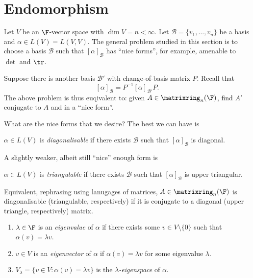 \documentclass[a4paper]{article}
\newcommand*{\M}{\matrixring}
\newcommand*{\basis}{\mathcal}
\theoremstyle{definition}
\begin{document}
\section{Endomorphism}

Let \(V\) be an \(\F\)-vector space with \(\dim V = n < \infty\). Let \(\basis B =\{v_1, \dots, v_n\}\) be a basis and \(\alpha \in L(V) = L(V, V)\). The general problem studied in this section is to choose a basis \(\basis B\) such that \([\alpha]_{\basis B}\) has ``nice forms'', for example, amenable to \(\det\) and \(\tr\).

Suppose there is another basis \(\basis B'\) with change-of-basis matrix \(P\). Recall that
\[
  [\alpha]_{\basis B} = P^{-1}[\alpha]_{\basis B'}P.
\]
The above problem is thus euqivalent to: given \(A \in \M_n(\F)\), find \(A'\) conjugate to \(A\) and in a ``nice form''.

What are the nice forms that we desire? The best we can have is

\begin{definition}[Diagonalisable]
  \(\alpha \in L(V)\) is \emph{diagonalisable} if there exists \(\basis B\) such that \([\alpha]_{\basis B}\) is diagonal.
\end{definition}

A slightly weaker, albeit still ``nice'' enough form is

\begin{definition}[Triangulable]
  \(\alpha \in L(V)\) is \emph{triangulable} if there exists \(\basis B\) such that \([\alpha]_{\basis B}\) is upper triangular.
\end{definition}

Equivalent, rephrasing using lanugages of matrices, \(A \in \M_n(\F)\) is diagonalisable (triangulable, respectively) if it is conjugate to a diagonal (upper triangle, respectively) matrix.

\begin{definition}\leavevmode
  \begin{enumerate}
  \item \(\lambda \in \F\) is an \emph{eigenvalue} of \(\alpha\) if there exists some \(v \in V\setminus\{0\}\) such that \(\alpha(v) = \lambda v\).
  \item \(v \in V\) is an \emph{eigenvector} of \(\alpha\) if \(\alpha(v) = \lambda v\) for some eigenvalue \(\lambda\).
  \item \(V_\lambda = \{v \in V: \alpha(v) = \lambda v\}\) is the \emph{\(\lambda\)-eigenspace} of \(\alpha\).
  \end{enumerate}
\end{definition}
\end{document}
